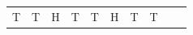 {{\begin{center}
\begin{tabular}[t]{|l|l|l|l|l|l|l|l|l|l|}
    
        T &
    
    
        T &
    
    
        H &
    
    
        T &
    
    
        T &
    
    
        H &
    
    
        T &
    
    
        T%
     \tabularnewline\cline{1-1}\cline{2-2}\cline{3-3}\cline{4-4}\cline{5-5}\cline{6-6}\cline{7-7}\cline{8-8}\cline{9-9}\cline{10-10}
    
    

\end{tabular}
\end{center}}}
